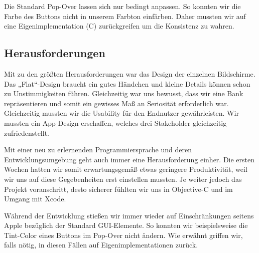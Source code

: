 Die Standard Pop-Over lassen sich nur bedingt anpassen. So konnten wir die Farbe des Buttons nicht in unserem Farbton einfärben. Daher mussten wir auf eine Eigenimplementation (C) zurückgreifen um die Konsistenz zu wahren.


\subsection{Herausforderungen}
	Mit zu den größten Herausforderungen war das Design der einzelnen Bildschirme. Das „Flat“-Design braucht ein gutes Händchen und kleine Details können schon zu Unstimmigkeiten führen. Gleichzeitig war uns bewusst, dass wir eine Bank repräsentieren und somit ein gewisses Maß an Seriosität erforderlich war. Gleichzeitig mussten wir die Usability für den Endnutzer gewährleisten. Wir mussten ein App-Design erschaffen, welches drei Stakeholder gleichzeitig zufriedenstellt.

%

	Mit einer neu zu erlernenden Programmiersprache und deren Entwicklungsumgebung geht auch immer eine Herausforderung einher. Die ersten Wochen hatten wir somit erwartungsgemäß etwas geringere Produktivität, weil wir uns auf diese Gegebenheiten erst einstellen mussten. Je weiter jedoch das Projekt voranschritt, desto sicherer fühlten wir uns in Objective-C und im Umgang mit Xcode.

	Während der Entwicklung stießen wir immer wieder auf Einschränkungen seitens Apple bezüglich der Standard GUI-Elemente. So konnten wir beispielsweise die Tint-Color eines Buttons im Pop-Over nicht ändern. Wie erwähnt griffen wir, falls nötig, in diesen Fällen auf Eigenimplementationen zurück.
	
